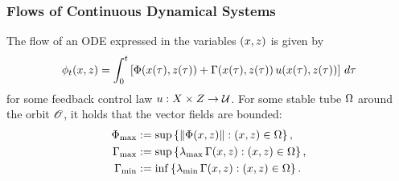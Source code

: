 \begin{frame}[t]
  \frametitle{Flows of Continuous Dynamical Systems}
  The flow of an ODE expressed in the variables $(x, z)$ is given
  by
  \begin{align*}
    \phi_{t}(x, z) = \int_{0}^{t} \left[ \Phi(x(\tau), z(\tau)) + \Gamma(x(\tau), z(\tau)) \,
      u(x(\tau), z(\tau)) \right] \, d\tau
  \end{align*}
  for some feedback control law $u : X \times Z \to \mathcal{U}$. For some stable
  tube $\Omega$ around the orbit $\mathscr O$, it holds that the vector fields
  are bounded:
  \begin{align*}
    \Phi_{\max} & := \sup \left\{ \left\| \Phi(x, z) \right\| : (x, z) \in
      \Omega \right\},\\
    \Gamma_{\max} &:= \sup \left\{\operatorname*{\lambda_{\max}}\Gamma(x, z) : (x, z) \in \Omega
    \right\},\\
    \Gamma_{\min} &:= \inf \left\{\operatorname*{\lambda_{\min}}\Gamma(x, z) : (x, z) \in \Omega
    \right\}.
  \end{align*}
\end{frame}


